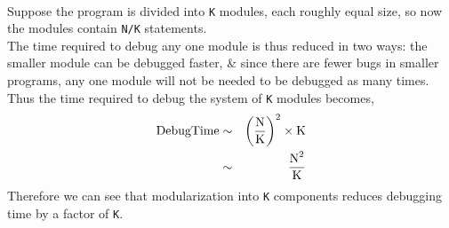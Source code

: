 \documentclass{article}
\begin{document}
\begin{enumerate}
\begin{itemize}
\begin{itemize}
\begin{eqnarray*}
            \end{eqnarray*}
            Suppose the program is divided into \lstinline|K| modules, each roughly equal size, so now the modules contain \lstinline|N/K| statements.\\
            The time required to debug any one module is thus reduced in two ways: the smaller module can be debugged faster, \& since there are fewer bugs in smaller programs, any one module will not be needed to be debugged as many times. Thus the time required to debug the system of \lstinline|K| modules becomes,
            \begin{eqnarray*}
                \text{DebugTime}&\sim&\left(\frac{\text{\lstinline|N|}}{\text{\lstinline|K|}}\right)^2\times \text{\lstinline|K|}\\
                &\sim& \frac{\text{\lstinline|N|}^2}{\text{\lstinline|K|}}
            \end{eqnarray*}
            Therefore we can see that modularization into \lstinline|K| components reduces debugging time by a factor of \lstinline|K|.
        \end{itemize}
    \end{itemize}
 

\end{enumerate}
\end{document}
